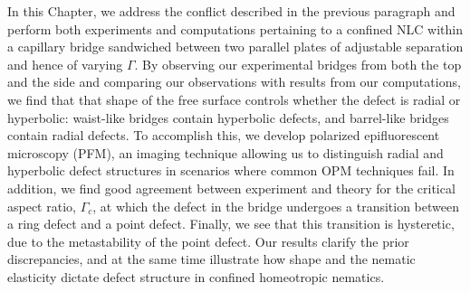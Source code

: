 In this Chapter, we address the conflict described in the previous paragraph and perform both experiments and computations pertaining to a confined NLC within a capillary bridge sandwiched between two parallel plates of adjustable separation and hence of varying $\Gamma$.
By observing our experimental bridges from both the top and the side and comparing our observations with results from our computations, we find that that shape of the free surface controls whether the defect is radial or hyperbolic: waist-like bridges contain hyperbolic defects, and barrel-like bridges contain radial defects.
To accomplish this, we develop polarized epifluorescent microscopy (PFM), an imaging technique allowing us to distinguish radial and hyperbolic defect structures in scenarios where common OPM techniques fail.
In addition, we find good agreement between experiment and theory for the critical aspect ratio, $\Gamma_c$, at which the defect in the bridge undergoes a transition between a ring defect and a point defect.
Finally, we see that this transition is hysteretic, due to the metastability of the point defect.
Our results clarify the prior discrepancies, and at the same time illustrate how shape and the nematic elasticity dictate defect structure in confined homeotropic nematics.




